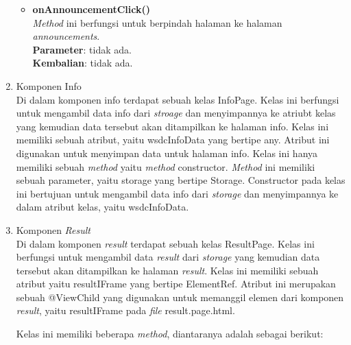 \begin{enumerate}
\begin{itemize}
		\item \textbf{onAnnouncementClick()} \\
			\textit{Method} ini berfungsi untuk berpindah halaman ke halaman \textit{announcements}.\\
			\textbf{Parameter}: tidak ada.\\
			\textbf{Kembalian}: tidak ada.
	\end{itemize}
	
	
	\item Komponen Info \\
		Di dalam komponen info terdapat sebuah kelas InfoPage. Kelas ini berfungsi untuk mengambil data info dari \textit{stroage} dan menyimpannya ke atriubt kelas yang kemudian data tersebut akan ditampilkan ke halaman info. Kelas ini memiliki sebuah atribut, yaitu wsdcInfoData yang bertipe any. Atribut ini digunakan untuk menyimpan data untuk halaman info. Kelas ini hanya memiliki sebuah \textit{method} yaitu \textit{method} constructor. \textit{Method} ini memiliki sebuah parameter, yaitu storage yang bertipe Storage. Constructor pada kelas ini bertujuan untuk mengambil data info dari \textit{storage} dan menyimpannya ke dalam atribut kelas, yaitu wsdcInfoData. 
		
	\item Komponen \textit{Result} \\
		Di dalam komponen \textit{result} terdapat sebuah kelas ResultPage. Kelas ini berfungsi untuk mengambil data \textit{result} dari \textit{storage} yang kemudian data tersebut akan ditampilkan ke halaman \textit{result}. Kelas ini memiliki sebuah atribut yaitu resultIFrame yang bertipe ElementRef. Atribut ini merupakan sebuah @ViewChild yang digunakan untuk memanggil elemen dari komponen \textit{result}, yaitu resultIFrame pada \textit{file} result.page.html. 
		
		Kelas ini memiliki beberapa \textit{method}, diantaranya adalah sebagai berikut:
		

\end{enumerate}
